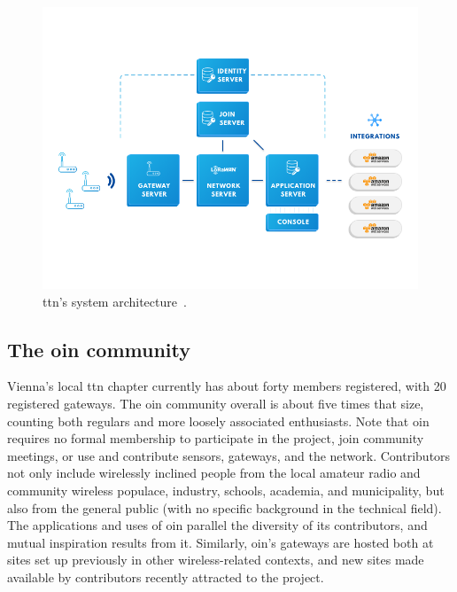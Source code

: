 \begin{figure}
  \centering
  \includegraphics[width=\columnwidth]{figures/ttn_tech_stack.png}
  \caption{\gls{ttn}'s system architecture~\cite{ttn}.}
  \label{fig:ttn-arch}
\end{figure}


\subsection{The \gls{oin} community}

Vienna's local \gls{ttn} chapter currently has about forty members
registered, with 20 registered gateways. The \gls{oin} community
overall is about five times that size, counting both regulars and
more loosely associated enthusiasts. Note that \gls{oin} requires
no formal membership to participate in the project, join community
meetings, or use and contribute sensors, gateways, and the network.
Contributors not only include wirelessly inclined people from the
local amateur radio and community wireless populace, industry,
schools, academia, and municipality, but also from the general
public (with no specific background in the technical field).
The applications and uses of \gls{oin} parallel the diversity
of its contributors, and mutual inspiration results from it.
Similarly, \gls{oin}'s gateways are hosted both at sites set up
previously in other wireless-related contexts, and new sites
made available by contributors recently attracted to the project.
